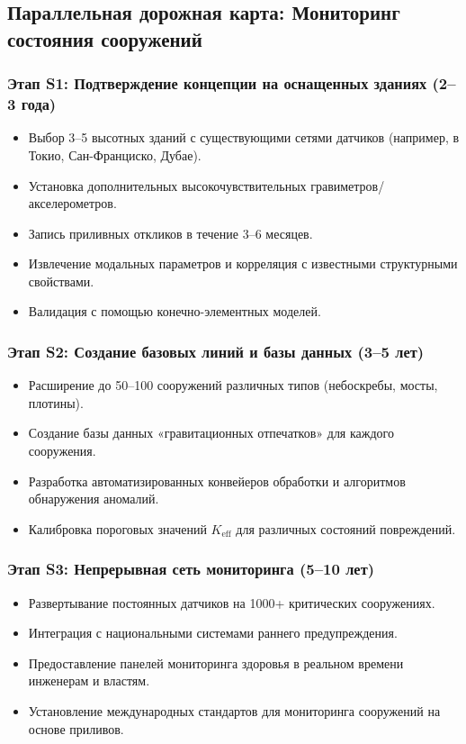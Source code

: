 \documentclass[12pt,a4paper]{article}
\theoremstyle{remark}
\begin{document}
	\subsection{Параллельная дорожная карта: Мониторинг состояния сооружений}
	
	\subsubsection{Этап S1: Подтверждение концепции на оснащенных зданиях (2–3 года)}
	
	\begin{itemize}
		\item Выбор 3–5 высотных зданий с существующими сетями датчиков (например, в Токио, Сан-Франциско, Дубае).
		\item Установка дополнительных высокочувствительных гравиметров/акселерометров.
		\item Запись приливных откликов в течение 3–6 месяцев.
		\item Извлечение модальных параметров и корреляция с известными структурными свойствами.
		\item Валидация с помощью конечно-элементных моделей.
	\end{itemize}
	
	\subsubsection{Этап S2: Создание базовых линий и базы данных (3–5 лет)}
	
	\begin{itemize}
		\item Расширение до 50–100 сооружений различных типов (небоскребы, мосты, плотины).
		\item Создание базы данных «гравитационных отпечатков» для каждого сооружения.
		\item Разработка автоматизированных конвейеров обработки и алгоритмов обнаружения аномалий.
		\item Калибровка пороговых значений \(K_{\mathrm{eff}}\) для различных состояний повреждений.
	\end{itemize}
	
	\subsubsection{Этап S3: Непрерывная сеть мониторинга (5–10 лет)}
	
	\begin{itemize}
		\item Развертывание постоянных датчиков на 1000+ критических сооружениях.
		\item Интеграция с национальными системами раннего предупреждения.
		\item Предоставление панелей мониторинга здоровья в реальном времени инженерам и властям.
		\item Установление международных стандартов для мониторинга сооружений на основе приливов.
	\end{itemize}
	
\end{document}
